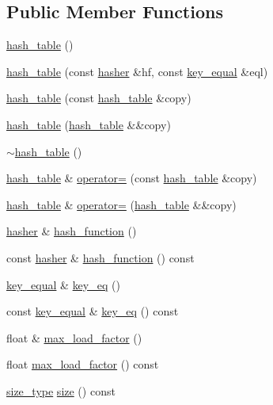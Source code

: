 \subsection*{Public Member Functions}
\begin{DoxyCompactItemize}
\item 
\hyperlink{classhash__table_a0230402b435247b23c4898022c9aec5e}{hash\+\_\+table} ()
\item 
\hyperlink{classhash__table_aceec87dc4c9abc44d7b68fe8203d3ce6}{hash\+\_\+table} (const \hyperlink{classhash__table_a50374ab474440525f6739d9e45a851f9}{hasher} \&hf, const \hyperlink{classhash__table_a0261fc20ffaacd3a8b3f4562dd631beb}{key\+\_\+equal} \&eql)
\item 
\hyperlink{classhash__table_aefa871baa0421eef41e21b41d92b8243}{hash\+\_\+table} (const \hyperlink{classhash__table}{hash\+\_\+table} \&copy)
\item 
\hyperlink{classhash__table_aaba701f67012d269277871724daafac5}{hash\+\_\+table} (\hyperlink{classhash__table}{hash\+\_\+table} \&\&copy)
\item 
\hyperlink{classhash__table_a60e0f19084be4a67632f2b992de85402}{$\sim$hash\+\_\+table} ()
\item 
\hyperlink{classhash__table}{hash\+\_\+table} \& \hyperlink{classhash__table_a2192f10ce77baea09e73d46f8c5e8254}{operator=} (const \hyperlink{classhash__table}{hash\+\_\+table} \&copy)
\item 
\hyperlink{classhash__table}{hash\+\_\+table} \& \hyperlink{classhash__table_a74641c17369c448fdf63eab1d759e3c3}{operator=} (\hyperlink{classhash__table}{hash\+\_\+table} \&\&copy)
\item 
\hyperlink{classhash__table_a50374ab474440525f6739d9e45a851f9}{hasher} \& \hyperlink{classhash__table_ad92313e501faa8d583bc17aa2928e2b9}{hash\+\_\+function} ()
\item 
const \hyperlink{classhash__table_a50374ab474440525f6739d9e45a851f9}{hasher} \& \hyperlink{classhash__table_ad6722316ea6db15d511037d3083b1d41}{hash\+\_\+function} () const 
\item 
\hyperlink{classhash__table_a0261fc20ffaacd3a8b3f4562dd631beb}{key\+\_\+equal} \& \hyperlink{classhash__table_a360462913491830ed605a6e7694c087f}{key\+\_\+eq} ()
\item 
const \hyperlink{classhash__table_a0261fc20ffaacd3a8b3f4562dd631beb}{key\+\_\+equal} \& \hyperlink{classhash__table_ac2fc819d64a284bba17fbf6a66110706}{key\+\_\+eq} () const 
\item 
float \& \hyperlink{classhash__table_a18411f20b0593f8c34230862b6a16397}{max\+\_\+load\+\_\+factor} ()
\item 
float \hyperlink{classhash__table_abd5414b8eaa7e8cfb733992d2ff940a9}{max\+\_\+load\+\_\+factor} () const 
\item 
\hyperlink{classhash__table_a8d85f5b55ee3116e6d40c1de62e62368}{size\+\_\+type} \hyperlink{classhash__table_a0e67f8c6828034c159ea597a7e31b3c1}{size} () const 
\end{DoxyCompactItemize}



